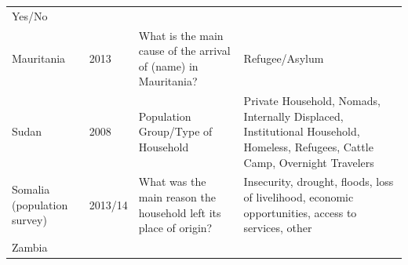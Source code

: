 \documentclass[
]{article}
\begin{document}
\begin{longtable}[]{@{}llll@{}}
\begin{minipage}[t]{0.22\columnwidth}
Yes/No\strut
\end{minipage}\tabularnewline
\begin{minipage}[t]{0.22\columnwidth}\raggedright
Mauritania\strut
\end{minipage} & \begin{minipage}[t]{0.22\columnwidth}\raggedright
2013\strut
\end{minipage} & \begin{minipage}[t]{0.22\columnwidth}\raggedright
What is the
main cause of
the arrival of
(name) in
Mauritania?\strut
\end{minipage} & \begin{minipage}[t]{0.22\columnwidth}\raggedright
Refugee/Asylum\strut
\end{minipage}\tabularnewline
\begin{minipage}[t]{0.22\columnwidth}\raggedright
Sudan\strut
\end{minipage} & \begin{minipage}[t]{0.22\columnwidth}\raggedright
2008\strut
\end{minipage} & \begin{minipage}[t]{0.22\columnwidth}\raggedright
Population
Group/Type of
Household\strut
\end{minipage} & \begin{minipage}[t]{0.22\columnwidth}\raggedright
Private
Household,
Nomads,
Internally
Displaced,
Institutional
Household,
Homeless,
Refugees,
Cattle Camp,
Overnight
Travelers\strut
\end{minipage}\tabularnewline
\begin{minipage}[t]{0.22\columnwidth}\raggedright
Somalia
(population
survey)\strut
\end{minipage} & \begin{minipage}[t]{0.22\columnwidth}\raggedright
2013/14\strut
\end{minipage} & \begin{minipage}[t]{0.22\columnwidth}\raggedright
What was the
main reason the
household left
its place of
origin?\strut
\end{minipage} & \begin{minipage}[t]{0.22\columnwidth}\raggedright
Insecurity,
drought,
floods, loss of
livelihood,
economic
opportunities,
access to
services, other\strut
\end{minipage}\tabularnewline
\begin{minipage}[t]{0.22\columnwidth}\raggedright
Zambia\strut
\end{minipage} & \begin{minipage}[t]{0.22\columnwidth}\raggedright

\end{minipage}
\end{longtable}
\end{document}
